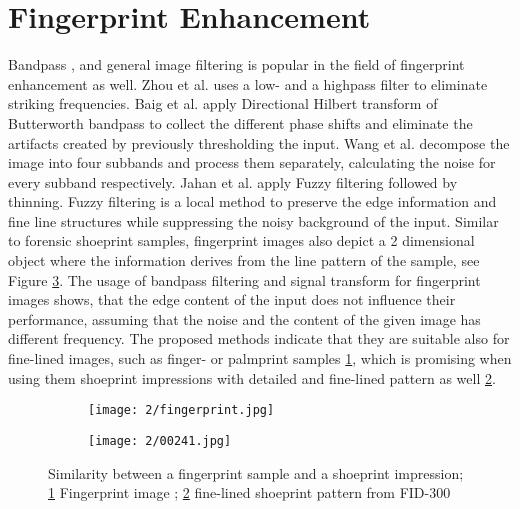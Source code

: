 \documentclass[draft,final]{vutinfth} %
\begin{document}
\section*{Fingerprint Enhancement}
\par
Bandpass \cite{zhou2011adaptive}, \cite{baig2015enhancement} and general image filtering  \cite{jahan2017robust} is popular in the field of fingerprint enhancement as well.
Zhou et al. \cite{zhou2011adaptive} uses a low- and a highpass filter to eliminate striking frequencies. 
Baig et al. \cite{baig2015enhancement} apply Directional Hilbert transform of Butterworth bandpass to collect the different phase shifts and eliminate the artifacts created by previously thresholding the input.
Wang et al. \cite{wang2014enhanced} decompose the image into four subbands and process them separately, calculating the noise for every subband respectively.
Jahan et al. \cite{jahan2017robust} apply Fuzzy filtering followed by thinning.
Fuzzy filtering is a local method to preserve the edge information and fine line structures while suppressing the noisy background of the input.
Similar to forensic shoeprint samples, fingerprint images also depict a 2 dimensional object where the information derives from the line pattern of the sample, see Figure \ref{fig:rw:fingerprint}.
The usage of bandpass filtering and signal transform for fingerprint images shows, that the edge content of the input does not influence their performance, assuming that the noise and the content of the given image has different frequency.
The proposed methods indicate that they are suitable also for fine-lined images, such as finger- or palmprint samples \ref{fig:rw:fp}, which is promising when using them shoeprint impressions with detailed and fine-lined pattern as well \ref{fig:rw:ref}. 

\begin{figure}[h]
  \centering
  \begin{subfigure}[t]{0.4\columnwidth}
    \centering
    \texttt{[image: 2/fingerprint.jpg]}
    \subcaption{}
    \label{fig:rw:fp}
  \end{subfigure}
  \begin{subfigure}[t]{0.4\columnwidth}
    \centering
    \texttt{[image: 2/00241.jpg]}
    \subcaption{}
    \label{fig:rw:ref}
  \end{subfigure}
  \caption{Similarity between a fingerprint sample and a shoeprint  impression;
		\ref{fig:rw:fp} Fingerprint image \cite{van2016fingerprint}; \ref{fig:rw:ref} fine-lined shoeprint pattern from FID-300  \cite{kortylewski2014unsupervised}}
  \label{fig:rw:fingerprint} %
\end{figure}
\end{document}
